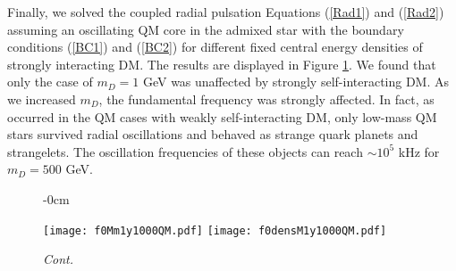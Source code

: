 \documentclass[universe,article,accept,moreauthors,pdftex]{Definitions/mdpi}
\begin{document}
Finally, we solved the coupled radial pulsation Equations (\ref{Rad1}) and (\ref{Rad2}) assuming an oscillating QM core in the admixed star with the boundary conditions (\ref{BC1}) and (\ref{BC2}) for different fixed central energy densities of strongly interacting DM. The results are displayed in Figure \ref{fig:f0Mdens1000QM}. We found that only the case of $m_{D}=1$ GeV was unaffected by strongly self-interacting DM. As we increased $m_{D}$, the fundamental frequency was strongly affected. In fact, as occurred in the QM cases with weakly self-interacting DM, only low-mass QM stars survived radial oscillations and behaved as strange quark planets and strangelets. The oscillation frequencies of these objects can reach $\sim$${10^{5}}$ kHz for $m_{D}=500$ GeV.

\begin{figure}[H]

\begin{adjustwidth}{-\extralength}{0cm}
\centering %

{\texttt{[image: f0Mm1y1000QM.pdf]}\vspace{3pt}
	  \texttt{[image: f0densM1y1000QM.pdf]}}\\
\end{adjustwidth}
\caption{\emph{Cont. }}
\label{fig:f0Mdens1000QM}

\end{figure}
\end{document}
